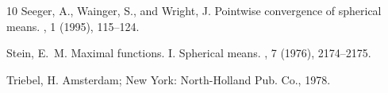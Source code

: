 \documentclass[11pt]{amsart}
\theoremstyle{plain}
\theoremstyle{definition}
\theoremstyle{remark}
\numberwithin{equation}{section}
\begin{document}
\begin{thebibliography}{10}
{\sc Seeger, A., Wainger, S., and Wright, J.}
\newblock Pointwise convergence of spherical means.
, 1 (1995), 115--124.

{\sc Stein, E.~M.}
\newblock Maximal functions. {I}. {S}pherical means.
, 7 (1976), 2174--2175.

{\sc Triebel, H.}
\newblock Amsterdam; New York: North-Holland Pub. Co., 1978.

\end{thebibliography}
\end{document}
